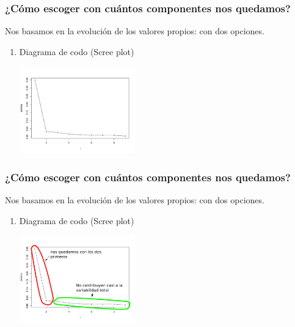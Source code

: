 \documentclass{beamer}
\begin{document}
\begin{frame}\frametitle{¿Cómo escoger con cuántos componentes nos quedamos?}
                  \begin{overlayarea}{\textwidth}{6.5cm} 
  Nos basamos en la evolución de los valores propios: con dos opciones.
  \begin{enumerate}
  \item<+-> Diagrama de codo (Scree plot)
  \begin{center}
    \includegraphics[width=5cm]{codoepf}
  \end{center}

  \end{enumerate}
                  \end{overlayarea}
  
\end{frame}
\begin{frame}\frametitle{¿Cómo escoger con cuántos componentes nos quedamos?}
              \begin{overlayarea}{\textwidth}{6.5cm} 
  Nos basamos en la evolución de los valores propios: con dos opciones.
  \begin{enumerate}
  \item<+-> Diagrama de codo (Scree plot)
  \begin{center}
    \includegraphics[width=5cm]{codo-texto.png}
  \end{center}

  \end{enumerate}
  
              \end{overlayarea}
\end{frame}
\end{document}
